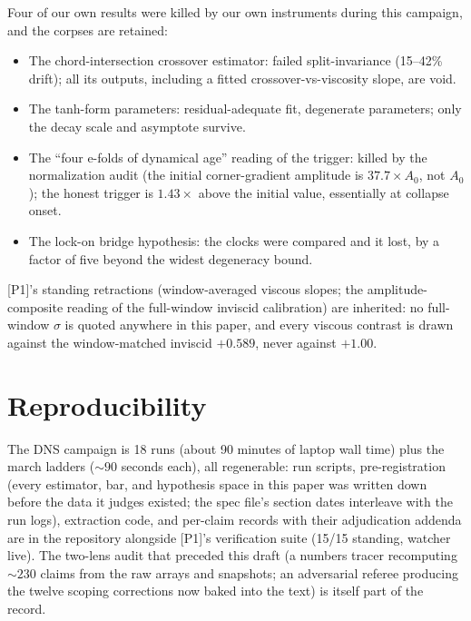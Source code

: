 \documentclass[11pt]{article}
\newcommand{\Anaught}{A_0}
\begin{document}
Four of our own results were killed by our own instruments during this
campaign, and the corpses are retained:

\begin{itemize}
\item The chord-intersection crossover estimator: failed
  split-invariance (15--42\% drift); all its outputs, including a
  fitted crossover-vs-viscosity slope, are void.
\item The tanh-form parameters: residual-adequate fit, degenerate
  parameters; only the decay scale and asymptote survive.
\item The ``four e-folds of dynamical age'' reading of the trigger:
  killed by the normalization audit (the initial corner-gradient
  amplitude is $37.7\times\Anaught$, not $\Anaught$); the honest
  trigger is $1.43\times$ above the initial value, essentially at
  collapse onset.
\item The lock-on bridge hypothesis: the clocks were compared and it
  lost, by a factor of five beyond the widest degeneracy bound.
\end{itemize}

[P1]'s standing retractions (window-averaged viscous slopes; the
amplitude-composite reading of the full-window inviscid calibration)
are inherited: no full-window $\sigma$ is quoted anywhere in this
paper, and every viscous contrast is drawn against the window-matched
inviscid $+0.589$, never against $+1.00$.

\section{Reproducibility}\label{sec:repro}

The DNS campaign is 18 runs (about 90 minutes of laptop wall time)
plus the march ladders (${\sim}90$ seconds each), all regenerable: run
scripts, pre-registration (every estimator, bar, and hypothesis space
in this paper was written down before the data it judges existed; the
spec file's section dates interleave with the run logs), extraction
code, and per-claim records with their adjudication addenda are in the
repository alongside [P1]'s verification suite (15/15 standing,
watcher live). The two-lens audit that preceded this draft (a numbers
tracer recomputing ${\sim}230$ claims from the raw arrays and
snapshots; an adversarial referee producing the twelve scoping
corrections now baked into the text) is itself part of the record.
\end{document}

